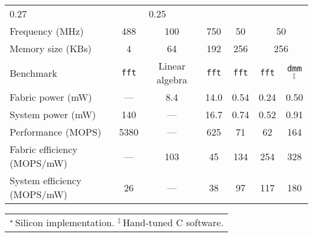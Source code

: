 {\begin{table*}[h]
\begin{tabular}{lcccc@{\hskip 2em}cc}
	0.27 &
	\multicolumn{2}{c}{0.25} \\
        Frequency (MHz) &
        488 &
        100 &
        750 &
        50 &
        \multicolumn{2}{c}{50} \\
        Memory size (KBs) &
        4 &
        64 &
        192 &
        256 &
        \multicolumn{2}{c}{256} \\
        \midrule
        Benchmark &
        {\tt fft} &
        Linear algebra &
        {\tt fft} &
        {\tt fft} &
        {\tt fft} & {\tt dmm$^\ddag$} \\
	Fabric power (mW) &
	--- &
	8.4 &
	14.0 &
	0.54 &
	0.24 & 0.50 \\
	System power (mW) &
	140 &
	--- &
	16.7 &
	0.74 &
	0.52 & 0.91\\
	Performance (MOPS) &
	5380 &
	--- &
	625 &
	71 &
	62 & 164 \\
	Fabric efficiency (MOPS/mW) &
	--- &
	103 &
	45 &
	134 &
	254 & 328 \\
	System efficiency (MOPS/mW) &
	26 &
	--- &
	38 &
	97 &
	117 & 180\\
	\bottomrule
      \end{tabular}
    
    \vspace{1pt}
    
    \begin{tabular}{c}
      $^\star$\,Silicon implementation. \quad
      $^\ddag$\,Hand-tuned C software. %
    \end{tabular}
  \end{table*}
}

